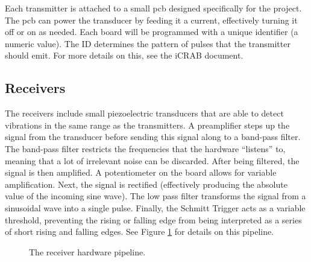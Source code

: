 \documentclass[12pt]{article}
\begin{document}
Each transmitter is attached to a small \gls{pcb} designed
specifically for the project.
The \gls{pcb} can power the transducer by feeding it a current, effectively
turning it off or on as needed.
Each board will be programmed with a unique identifier (a numeric value).
The ID determines the pattern of pulses that the transmitter should emit.
For more details on this, see the \gls{iCRAB} document.

\subsection{Receivers}

The receivers include small piezoelectric transducers that are able to detect
vibrations in the same range as the transmitters.
A preamplifier steps up the signal from the transducer before sending this
signal along to a band-pass filter.
The band-pass filter restricts the frequencies that the hardware ``listens''
to, meaning that a lot of irrelevant noise can be discarded.
After being filtered, the signal is then amplified.
A potentiometer on the board allows for variable amplification.
Next, the signal is
rectified (effectively producing the absolute value of the incoming sine wave).
The low pass filter transforms the signal from a sinusoidal wave into a single
pulse.
Finally, the Schmitt Trigger acts as a variable threshold, preventing the
rising or falling edge from being interpreted as a series of short rising and
falling edges.
See Figure \ref{fig:rx-detail} for details on this pipeline.

\begin{figure}[h]
\begin{center}
\end{center}
\caption{The receiver hardware pipeline.}
\label{fig:rx-detail}
\end{figure}
\end{document}
